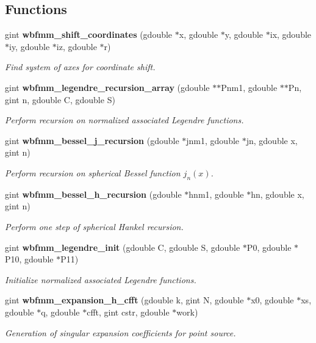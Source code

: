 \subsection*{Functions}
\begin{DoxyCompactItemize}
\item 
gint \textbf{ wbfmm\+\_\+shift\+\_\+coordinates} (gdouble $\ast$x, gdouble $\ast$y, gdouble $\ast$ix, gdouble $\ast$iy, gdouble $\ast$iz, gdouble $\ast$r)
\begin{DoxyCompactList}\small\item\em Find system of axes for coordinate shift. \end{DoxyCompactList}\item 
gint \textbf{ wbfmm\+\_\+legendre\+\_\+recursion\+\_\+array} (gdouble $\ast$$\ast$Pnm1, gdouble $\ast$$\ast$Pn, gint n, gdouble C, gdouble S)
\begin{DoxyCompactList}\small\item\em Perform recursion on normalized associated Legendre functions. \end{DoxyCompactList}\item 
gint \textbf{ wbfmm\+\_\+bessel\+\_\+j\+\_\+recursion} (gdouble $\ast$jnm1, gdouble $\ast$jn, gdouble x, gint n)
\begin{DoxyCompactList}\small\item\em Perform recursion on spherical Bessel function $j_{n}(x)$. \end{DoxyCompactList}\item 
gint \textbf{ wbfmm\+\_\+bessel\+\_\+h\+\_\+recursion} (gdouble $\ast$hnm1, gdouble $\ast$hn, gdouble x, gint n)
\begin{DoxyCompactList}\small\item\em Perform one step of spherical Hankel recursion. \end{DoxyCompactList}\item 
gint \textbf{ wbfmm\+\_\+legendre\+\_\+init} (gdouble C, gdouble S, gdouble $\ast$P0, gdouble $\ast$P10, gdouble $\ast$P11)
\begin{DoxyCompactList}\small\item\em Initialize normalized associated Legendre functions. \end{DoxyCompactList}\item 
gint \textbf{ wbfmm\+\_\+expansion\+\_\+h\+\_\+cfft} (gdouble k, gint N, gdouble $\ast$x0, gdouble $\ast$xs, gdouble $\ast$q, gdouble $\ast$cfft, gint cstr, gdouble $\ast$work)
\begin{DoxyCompactList}\small\item\em Generation of singular expansion coefficients for point source. \end{DoxyCompactList}\item 

\end{DoxyCompactItemize}
